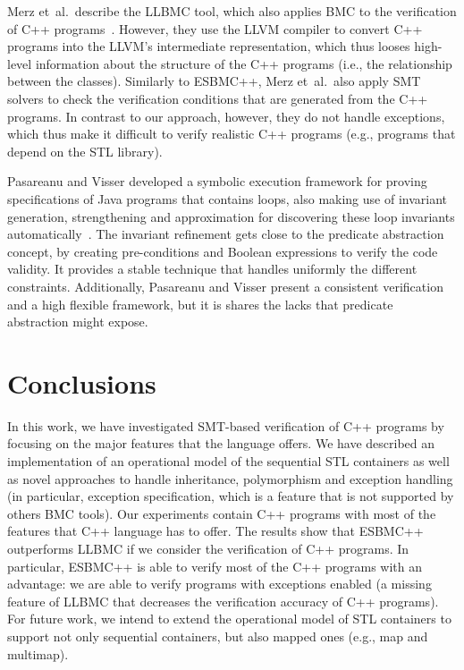 \documentclass[a4paper]{llncs}
\begin{document}
Merz et~al.\ describe the LLBMC tool, which also applies BMC to the verification
of C++ programs~\cite{Florian12}. However, they use the LLVM compiler to convert C++
programs into the LLVM's intermediate representation, which thus looses high-level
information about the structure of the C++ programs (i.e., the relationship between
the classes). Similarly to ESBMC++, Merz et~al.\ also apply SMT solvers to check the verification
conditions that are generated from the C++ programs. In contrast to our approach, however,
they do not handle exceptions, which thus make it difficult to verify realistic C++ programs
(e.g., programs that depend on the STL library).

Pasareanu and Visser developed a symbolic execution framework
for proving specifications of Java programs that contains loops,
also making use of invariant generation, strengthening and approximation
for discovering these loop invariants automatically~\cite{Pasareanu04}.
The invariant refinement gets close to the predicate abstraction concept,
by creating pre-conditions and Boolean expressions to verify the code validity.
It provides a stable technique that handles uniformly the different constraints.
Additionally, Pasareanu and Visser present a consistent verification and a high
flexible framework, but it is shares the lacks that predicate abstraction might
expose.

\section{Conclusions}

In this work, we have investigated SMT-based verification of C++ programs
by focusing on the major features that the language offers. We have described
an implementation of an operational model of the sequential STL containers
as well as novel approaches to handle inheritance, polymorphism and exception handling
(in particular, exception specification, which is a feature that is not supported by others
BMC tools). Our experiments contain C++ programs with most of the features that C++ language 
has to offer. The results show that ESBMC++ outperforms LLBMC if we consider the verification of C++ programs.
In particular, ESBMC++ is able to verify most of the C++ programs with an advantage: we are able to verify programs
with exceptions enabled (a missing feature of LLBMC that decreases the verification accuracy of
C++ programs). For future work, we intend to extend the operational model of STL containers
to support not only sequential containers, but also mapped ones (e.g., map and multimap).
\end{document}
